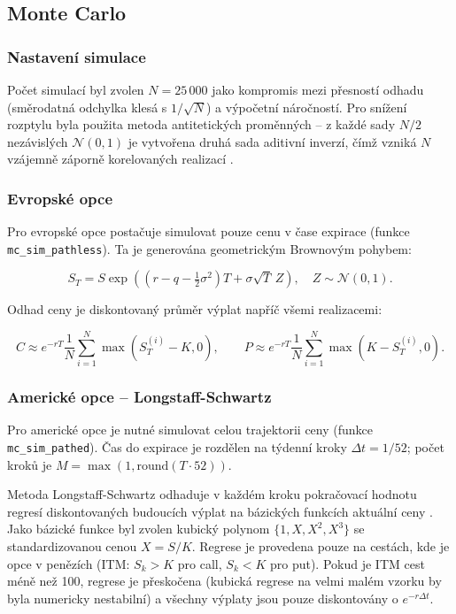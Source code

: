 
\subsection{Monte Carlo}

\subsubsection{Nastavení simulace}

Počet simulací byl zvolen \(N = 25\,000\) jako kompromis mezi přesností odhadu (směrodatná odchylka klesá s \(1/\sqrt{N}\)) a výpočetní náročností. Pro snížení rozptylu byla použita metoda antitetických proměnných – z každé sady \(N/2\) nezávislých \(\mathcal{N}(0,1)\) je vytvořena druhá sada aditivní inverzí, čímž vzniká \(N\) vzájemně záporně korelovaných realizací \citep[Kapitola~4.2]{Glasserman2004}.

\subsubsection{Evropské opce}

Pro evropské opce postačuje simulovat pouze cenu v čase expirace (funkce \texttt{mc\_sim\_pathless}). Ta je generována geometrickým Brownovým pohybem:

\[
S_T = S \exp\!\left((r - q - \tfrac{1}{2}\sigma^2)T + \sigma\sqrt{T}\,Z\right), \quad Z \sim \mathcal{N}(0,1).
\]

Odhad ceny je diskontovaný průměr výplat napříč všemi realizacemi:

\[
C \approx e^{-rT} \frac{1}{N} \sum_{i=1}^{N} \max(S_T^{(i)} - K, 0), \qquad
P \approx e^{-rT} \frac{1}{N} \sum_{i=1}^{N} \max(K - S_T^{(i)}, 0).
\]

\subsubsection{Americké opce – Longstaff-Schwartz}

Pro americké opce je nutné simulovat celou trajektorii ceny (funkce \texttt{mc\_sim\_pathed}). Čas do expirace je rozdělen na týdenní kroky \(\Delta t = 1/52\); počet kroků je \(M = \max(1, \text{round}(T \cdot 52))\).

Metoda Longstaff-Schwartz odhaduje v každém kroku pokračovací hodnotu regresí diskontovaných budoucích výplat na bázických funkcích aktuální ceny \citep{LongstaffSchwartz2001}. Jako bázické funkce byl zvolen kubický polynom \(\{1, X, X^2, X^3\}\) se standardizovanou cenou \(X = S/K\). Regrese je provedena pouze na cestách, kde je opce v penězích (ITM: \(S_k > K\) pro call, \(S_k < K\) pro put). Pokud je ITM cest méně než 100, regrese je přeskočena (kubická regrese na velmi malém vzorku by byla numericky nestabilní) a všechny výplaty jsou pouze diskontovány o \(e^{-r\Delta t}\).

